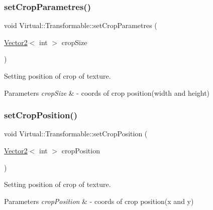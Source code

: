\subsubsection{\texorpdfstring{set\+Crop\+Parametres()}{setCropParametres()}}
{\footnotesize\ttfamily void Virtual\+::\+Transformable\+::set\+Crop\+Parametres (\begin{DoxyParamCaption}\item[{\hyperlink{struct_virtual_1_1_vector2}{Vector2}$<$ int $>$}]{crop\+Size }\end{DoxyParamCaption})}



Setting position of crop of texture. 


\begin{DoxyParams}{Parameters}
{\em crop\+Size} & -\/ coords of crop position(width and height) \\
\hline
\end{DoxyParams}
\hypertarget{class_virtual_1_1_transformable_afa2e1b7971db9c916a38f7dfa06a0b26}{}\label{class_virtual_1_1_transformable_afa2e1b7971db9c916a38f7dfa06a0b26} 
\subsubsection{\texorpdfstring{set\+Crop\+Position()}{setCropPosition()}}
{\footnotesize\ttfamily void Virtual\+::\+Transformable\+::set\+Crop\+Position (\begin{DoxyParamCaption}\item[{\hyperlink{struct_virtual_1_1_vector2}{Vector2}$<$ int $>$}]{crop\+Position }\end{DoxyParamCaption})}



Setting position of crop of texture. 


\begin{DoxyParams}{Parameters}
{\em crop\+Position} & -\/ coords of crop position(x and y) \\
\hline
\end{DoxyParams}
\hypertarget{class_virtual_1_1_transformable_a4d0e9c61931af6b42fac1dc0c3a1ed21}{}\label{class_virtual_1_1_transformable_a4d0e9c61931af6b42fac1dc0c3a1ed21} 
